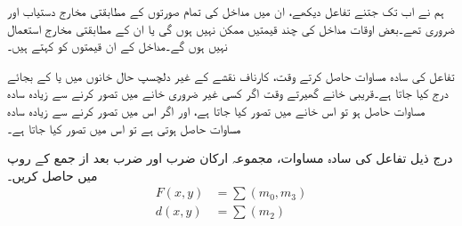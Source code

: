 ہم نے اب تک جتنے تفاعل دیکھے، ان میں مداخل کی تمام صورتوں کے مطابقتی مخارج دستیاب اور ضروری تھے۔بعض اوقات مداخل کی چند قیمتیں ممکن نہیں ہوں گی یا ان کے مطابقتی مخارج استعمال نہیں ہوں گے۔مداخل کے ان قیمتوں کو   کہتے ہیں۔ 

تفاعل کی سادہ مساوات حاصل کرتے وقت، کارناف نقشے کے غیر دلچسپ حال خانوں میں  یا  کے بجائے  درج کیا جاتا ہے۔قریبی خانے گھیرتے وقت اگر کسی غیر ضروری خانے میں  تصور کرنے سے زیادہ سادہ مساوات حاصل ہو تو اس خانے میں  تصور کیا جاتا ہے، اور اگر اس میں  تصور کرنے سے زیادہ سادہ مساوات حاصل ہوتی ہے تو اس میں  تصور کیا جاتا ہے۔


درج ذیل تفاعل کی سادہ مساوات، مجموعہ ارکان ضرب اور  ضرب بعد از جمع کے روپ میں حاصل کریں۔
\begin{align*}
F(x,y)&=\sum (m_0,m_3)\\
d(x,y)&=\sum (m_2)
\end{align*}
%

